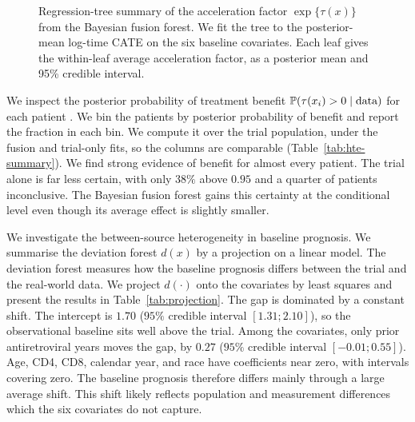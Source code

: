 \begin{figure}[!tb]
{}
  \caption{Regression-tree summary of the acceleration factor
    $\exp\{\tau(x)\}$ from the Bayesian fusion forest. We fit the tree to the
    posterior-mean log-time CATE on the six baseline covariates. Each leaf
    gives the within-leaf average acceleration factor, as a posterior mean
    and 95\% credible interval.}
  \label{fig:fit-the-fit}
\end{figure}

We inspect the posterior probability of treatment benefit $\mathbb{P}(\tau(x_i) > 0 \mid \text{data})$ for each patient \citep{henderson2020individualized}.
We bin the patients by posterior probability of benefit and report the fraction in each bin.
We compute it over the trial population, under the fusion and trial-only fits, so the columns are comparable (Table~\ref{tab:hte-summary}).
We find strong evidence of benefit for almost every patient.
The trial alone is far less certain, with only $38\%$ above $0.95$ and a quarter of patients inconclusive.
The Bayesian fusion forest gains this certainty at the conditional level even though its average effect is slightly smaller.

We investigate the between-source heterogeneity in baseline prognosis.
We summarise the deviation forest $d(x)$ by a projection on a linear model.
The deviation forest measures how the baseline prognosis differs between the trial and the real-world data.
We project $d(\cdot)$ onto the covariates by least squares and present the results in Table~\ref{tab:projection}.
The gap is dominated by a constant shift.
The intercept is $1.70$ ($95\%$ credible interval $[1.31;2.10]$), so the observational baseline sits well above the trial.
Among the covariates, only prior antiretroviral years moves the gap, by $0.27$ ($95\%$ credible interval $[-0.01;0.55]$).
Age, CD4, CD8, calendar year, and race have coefficients near zero, with intervals covering zero.
The baseline prognosis therefore differs mainly through a large average shift.
This shift likely reflects population and measurement differences which the six covariates do not capture.


